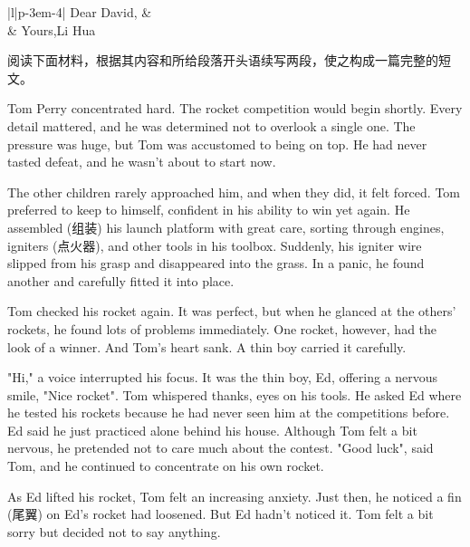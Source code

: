 \documentclass{英语试卷}
\begin{document}
\par\vspace{0.4em}
\begin{center}\begin{tabular}{{|l|p{\dimexpr\linewidth-3em-4\tabcolsep}|}}
\hline
Dear David, &  \\
 & Yours,Li Hua \\
\hline
\end{tabular}\end{center}
\vspace{0.4em}
\par 阅读下面材料，根据其内容和所给段落开头语续写两段，使之构成一篇完整的短文。\par
\par Tom Perry concentrated hard. The rocket competition would begin shortly. Every detail mattered, and he was determined not to overlook a single one. The pressure was huge, but Tom was accustomed to being on top. He had never tasted defeat, and he wasn't about to start now.\par
\par The other children rarely approached him, and when they did, it felt forced. Tom preferred to keep to himself, confident in his ability to win yet again. He assembled (组装) his launch platform with great care, sorting through engines, igniters (点火器), and other tools in his toolbox. Suddenly, his igniter wire slipped from his grasp and disappeared into the grass. In a panic, he found another and carefully fitted it into place.\par
\par Tom checked his rocket again. It was perfect, but when he glanced at the others' rockets, he found lots of problems immediately. One rocket, however, had the look of a winner. And Tom's heart sank. A thin boy carried it carefully.\par
\par "Hi," a voice interrupted his focus. It was the thin boy, Ed, offering a nervous smile, "Nice rocket". Tom whispered thanks, eyes on his tools. He asked Ed where he tested his rockets because he had never seen him at the competitions before. Ed said he just practiced alone behind his house. Although Tom felt a bit nervous, he pretended not to care much about the contest. "Good luck", said Tom, and he continued to concentrate on his own rocket.\par
\par As Ed lifted his rocket, Tom felt an increasing anxiety. Just then, he noticed a fin (尾翼) on Ed's rocket had loosened. But Ed hadn't noticed it. Tom felt a bit sorry but decided not to say anything.\par
\end{document}
